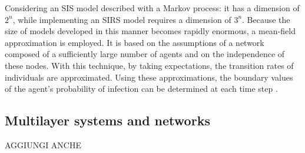 Considering an SIS model described with a Markov process: it has a dimension of $2^n$, while implementing an SIRS model requires a dimension of $3^n$. Because the size of models developed in this manner becomes rapidly enormous, a mean-field approximation is employed. It is based on the assumptions of a network composed of a sufficiently large number of agents and on the independence of these nodes. With this technique, by taking expectations, the transition rates of individuals are approximated. Using these approximations, the boundary values of the agent's probability of infection can be determined at each time step \cite{Hernandez_Vargas_2022}.

\subsection{Multilayer systems and networks} 

AGGIUNGI ANCHE \cite{Wang_2019} \cite{Krickel_2023}

